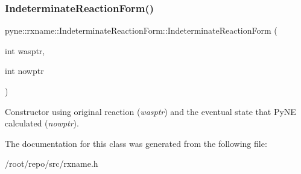 \subsubsection{\texorpdfstring{Indeterminate\+Reaction\+Form()}{IndeterminateReactionForm()}\hspace{0.1cm}{\footnotesize\ttfamily [4/4]}}
{\footnotesize\ttfamily pyne\+::rxname\+::\+Indeterminate\+Reaction\+Form\+::\+Indeterminate\+Reaction\+Form (\begin{DoxyParamCaption}\item[{int}]{wasptr,  }\item[{int}]{nowptr }\end{DoxyParamCaption})\hspace{0.3cm}{\ttfamily [inline]}}

Constructor using original reaction ({\itshape wasptr}) and the eventual state that Py\+NE calculated ({\itshape nowptr}). 

The documentation for this class was generated from the following file\+:\begin{DoxyCompactItemize}
\item 
/root/repo/src/rxname.\+h\end{DoxyCompactItemize}
